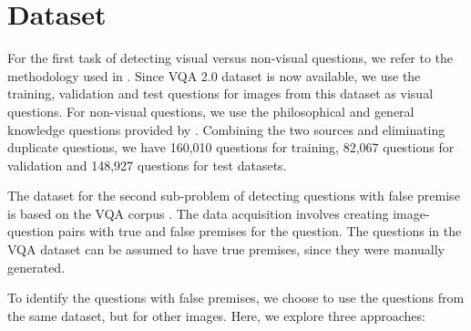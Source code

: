 \section{Dataset}

For the first task of detecting visual versus non-visual questions, we refer to the methodology used in \cite{ray2016question}. Since VQA 2.0 dataset \cite{goyal2016making} is now available, we use the training, validation and test questions for images from this dataset as visual questions. For non-visual questions, we use the philosophical and general knowledge questions provided by \cite{ray2016question}. Combining the two sources and eliminating duplicate questions, we have 
160,010 questions for training, 82,067 questions for validation and 148,927 questions for test datasets. 

The dataset for the second sub-problem of detecting questions with false premise is based on the VQA corpus \cite{AntolALMBZP15}. The data acquisition involves creating image-question pairs with true and false premises for the question. The questions in the VQA dataset can be assumed to have true premises, since they were manually generated.

To identify the questions with false premises, we choose to use the questions from the same dataset, but for other images. Here, we explore three approaches:

